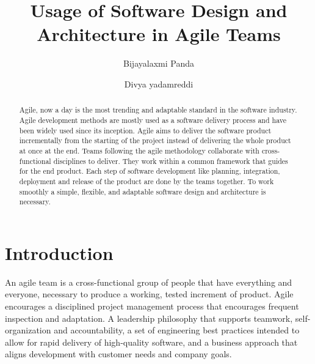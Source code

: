 \documentclass[sigplan,screen]{acmart}
\begin{document}
%
\title{Usage of Software Design and Architecture in Agile Teams}

%
\author{Bijayalaxmi Panda}

\author{Divya yadamreddi}

%
\begin{abstract}
Agile, now a day is the most trending and adaptable standard in the software industry. Agile development methods are mostly used as a software delivery process and have been widely used since its inception. Agile aims to deliver the software product incrementally from the starting of the project instead of delivering the whole product at once at the end. Teams following the agile methodology collaborate with cross-functional disciplines to deliver. They work within a common framework that guides for the end product. Each step of software development like planning, integration, deployment and release of the product are done by the teams together. To work smoothly a simple, flexible, and adaptable software design and architecture is necessary.
\end{abstract}

%

%
\maketitle

\section{Introduction}
An agile team is a cross-functional group of people that have everything and everyone, necessary to produce a working, tested increment of product. Agile encourages a disciplined project management process that encourages frequent inspection and adaptation. A leadership philosophy that supports teamwork, self-organization and accountability, a set of engineering best practices intended to allow for rapid delivery of high-quality software, and a business approach that aligns development with customer needs and company goals.\cite{Agile01}
\end{document}
